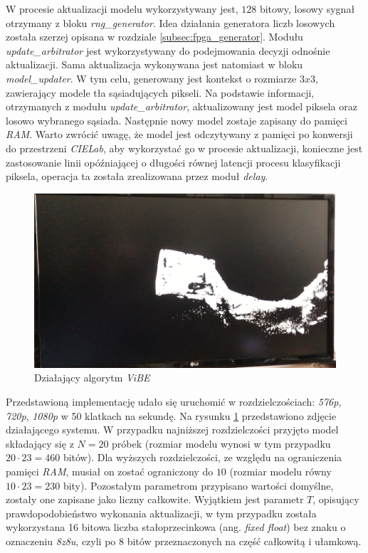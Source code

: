 W procesie aktualizacji modelu wykorzystywany jest, $128$ bitowy, losowy sygnał otrzymany z bloku \textit{rng\_generator}. Idea działania generatora liczb losowych została szerzej opisana w rozdziale \ref{subsec:fpga_generator}. Modułu \textit{update\_arbitrator} jest wykorzystywany do podejmowania decyzji odnośnie aktualizacji. Sama aktualizacja wykonywana jest natomiast w bloku \textit{model\_updater}. W tym celu, generowany jest kontekst o rozmiarze $3x3$, zawierający modele tła sąsiadujących pikseli. Na podstawie informacji, otrzymanych z modułu \textit{update\_arbitrator}, aktualizowany jest model piksela oraz losowo wybranego sąsiada. Następnie nowy model zostaje zapisany do pamięci \textit{RAM}. Warto zwrócić uwagę, że model jest odczytywany z pamięci po konwersji do przestrzeni \textit{CIELab}, aby wykorzystać go w procesie aktualizacji, konieczne jest zastosowanie linii opóźniającej o długości równej latencji procesu klasyfikacji piksela, operacja ta została zrealizowana przez moduł \textit{delay}.

	\begin{figure}[h!]
		\centering
		\includegraphics[scale=0.2]{img/4/vibe_example.png}
		\caption{Działający algorytm \textit{ViBE}}
		\label{fig:vibe_demo}
	\end{figure}

Przedstawioną implementację udało się uruchomić w rozdzielczościach: \textit{576p}, \textit{720p}, \textit{1080p} w 50 klatkach na sekundę. Na rysunku \ref{fig:vibe_demo} przedstawiono zdjęcie działającego systemu. W przypadku najniższej rozdzielczości przyjęto model składający się z $N=20$ próbek (rozmiar modelu wynosi w tym przypadku $20 \cdot 23=460$ bitów). Dla wyższych rozdzielczości, ze względu na ograniczenia pamięci \textit{RAM}, musiał on zostać ograniczony do $10$ (rozmiar modelu równy $10 \cdot 23=230$ bity). Pozostałym parametrom przypisano wartości domyślne, zostały one zapisane jako liczny całkowite. Wyjątkiem jest parametr $T$, opisujący prawdopodobieństwo wykonania aktualizacji, w tym przypadku została wykorzystana 16 bitowa liczba stałoprzecinkowa (ang. \textit{fixed float}) bez znaku o oznaczeniu \textit{8z8u}, czyli po 8 bitów przeznaczonych na część całkowitą i ułamkową.

